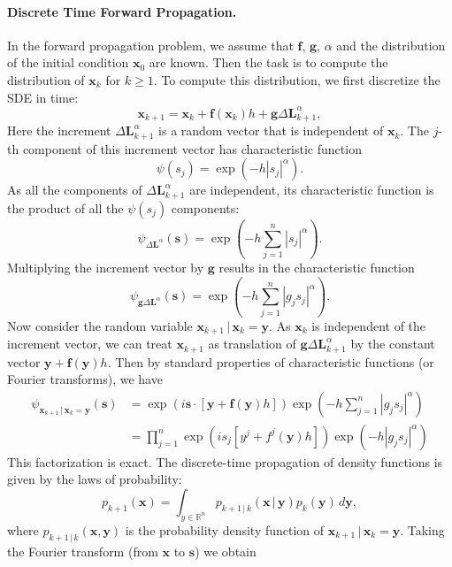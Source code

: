 \documentclass[12pt]{article}
\begin{document}
\paragraph{Discrete Time Forward Propagation.} In the forward propagation problem, we assume that $\mathbf{f}$, $\mathbf{g}$, $\alpha$ and the distribution of the initial condition $\mathbf{x}_0$ are known.  Then the task is to compute the distribution of $\mathbf{x}_k$ for $k \geq 1$.  To compute this distribution, we first discretize the SDE in time:
\[
\mathbf{x}_{k+1} = \mathbf{x}_k + \mathbf{f}(\mathbf{x}_k) h + \mathbf{g} \Delta \mathbf{L}^{\alpha}_{k+1},
\]
Here the increment $\Delta \mathbf{L}_{k+1}^{\alpha}$ is a random vector that is independent of $\mathbf{x}_k$.  The $j$-th component of this increment vector has characteristic function
\[
\psi(s_j) = \exp(- h |s_j|^\alpha).
\]
As all the components of $\Delta \mathbf{L}_{k+1}^{\alpha}$ are independent, its characteristic function is the product of all the $\psi(s_j)$ components:
\[
\psi_{\Delta \mathbf{L}^\alpha}(\mathbf{s}) = \exp\left( -h \sum_{j=1}^n |s_j|^\alpha \right).
\]
Multiplying the increment vector by $\mathbf{g}$ results in the characteristic function
\[
\psi_{\mathbf{g} \Delta \mathbf{L}^\alpha}(\mathbf{s}) = \exp\left( -h \sum_{j=1}^n |g_j s_j|^\alpha \right).
\]
Now consider the random variable $\mathbf{x}_{k+1} \, | \, \mathbf{x}_k = \mathbf{y}$.  As $\mathbf{x}_k$ is independent of the increment vector, we can treat $\mathbf{x}_{k+1}$ as translation of $\mathbf{g} \Delta \mathbf{L}^\alpha_{k+1}$ by the constant vector $\mathbf{y} + \mathbf{f}(\mathbf{y}) h$.  Then by standard properties of characteristic functions (or Fourier transforms), we have
\begin{align}
\psi_{\mathbf{x}_{k+1} \, | \, \mathbf{x}_k = \mathbf{y}}(\mathbf{s}) &= \exp\left( i \mathbf{s} \cdot [\mathbf{y} + \mathbf{f}(\mathbf{y}) h] \right) \exp\left( -h \sum_{j=1}^n |g_j s_j|^\alpha \right) \nonumber \\
\label{eqn:prodcharfun}
 &= \prod_{j=1}^n \exp\left( i s_j [y^j + f^j(\mathbf{y}) h] \right) \exp\left( -h |g_j s_j|^\alpha \right)
\end{align}
This factorization is exact.  The discrete-time propagation of density functions is given by the laws of probability:
\[
p_{k+1}(\mathbf{x}) = \int_{y \in \mathbb{R}^n} p_{k+1 \, | \, k}(\mathbf{x} \, | \,\mathbf{y}) p_k(\mathbf{y}) \, d \mathbf{y},
\]
where $p_{k+1 \, | \, k}(\mathbf{x},\mathbf{y})$ is the probability density function of $\mathbf{x}_{k+1} \, | \, \mathbf{x}_k = \mathbf{y}$.  Taking the Fourier transform (from $\mathbf{x}$ to $\mathbf{s}$) we obtain
\end{document}
